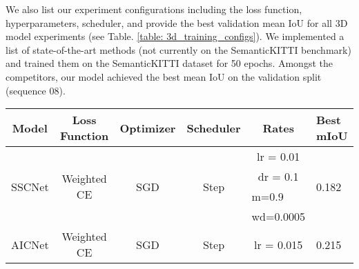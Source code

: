 \documentclass{article}
\begin{document}
We also list our experiment configurations including the loss function, hyperparameters, scheduler, and provide the best validation mean IoU for all 3D model experiments (see Table. \ref{table: 3d_training_configs}). We implemented a list of state-of-the-art methods (not currently on the SemanticKITTI benchmark) \cite{song2017semantic}\cite{li2020anisotropic}\cite{li2019rgbd}\cite{li2019depth} and trained them on the SemanticKITTI dataset for 50 epochs. Amongst the competitors, our model achieved the best mean IoU on the validation split (sequence 08). 


\begin{table}[tbh]
\begin{adjustbox}{max width=\textwidth}
\begin{tabular}{cccccl}
\hline
\multicolumn{1}{|c|}{Model}                   & \multicolumn{1}{c|}{Loss Function}                & \multicolumn{1}{c|}{Optimizer}            & \multicolumn{1}{c|}{Scheduler}             & \multicolumn{1}{c|}{Rates}      & \multicolumn{1}{l|}{Best mIoU}                   \\ \hline
\multicolumn{1}{|c|}{\multirow{4}{*}{SSCNet \cite{song2017semantic}}} & \multicolumn{1}{c|}{\multirow{4}{*}{Weighted CE}} & \multicolumn{1}{c|}{\multirow{4}{*}{SGD}} & \multicolumn{1}{c|}{\multirow{4}{*}{Step}} & \multicolumn{1}{c|}{lr = 0.01}  & \multicolumn{1}{l|}{\multirow{4}{*}{0.182}} \\ \cline{5-5}
\multicolumn{1}{|c|}{}                        & \multicolumn{1}{c|}{}                             & \multicolumn{1}{c|}{}                     & \multicolumn{1}{c|}{}                      & \multicolumn{1}{c|}{dr = 0.1}   & \multicolumn{1}{l|}{}                       \\ \cline{5-5}
\multicolumn{1}{|c|}{}                        & \multicolumn{1}{c|}{}                             & \multicolumn{1}{c|}{}                     & \multicolumn{1}{c|}{}                      & \multicolumn{1}{l|}{m=0.9}      & \multicolumn{1}{l|}{}                       \\ \cline{5-5}
\multicolumn{1}{|c|}{}                        & \multicolumn{1}{c|}{}                             & \multicolumn{1}{c|}{}                     & \multicolumn{1}{c|}{}                      & \multicolumn{1}{l|}{wd=0.0005}  & \multicolumn{1}{l|}{}                       \\ \hline
\multicolumn{1}{|c|}{\multirow{4}{*}{AICNet \cite{li2020anisotropic}}} & \multicolumn{1}{c|}{\multirow{4}{*}{Weighted CE}} & \multicolumn{1}{c|}{\multirow{4}{*}{SGD}} & \multicolumn{1}{c|}{\multirow{4}{*}{Step}} & \multicolumn{1}{c|}{lr = 0.015} & \multicolumn{1}{l|}{\multirow{4}{*}{0.215}} \\ \cline{5-5}

\end{tabular}
\end{adjustbox}
\end{table}
\end{document}
